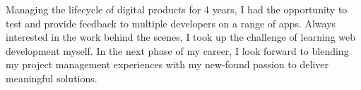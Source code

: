 

\begin{cvparagraph}

Managing the lifecycle of digital products for 4 years, I had the opportunity to test and provide feedback to multiple developers on a range of apps. Always interested in the work behind the scenes, I took up the challenge of learning web development myself. In the next phase of my career, I look forward to blending my project management experiences with my new-found passion to deliver meaningful solutions.
\end{cvparagraph}